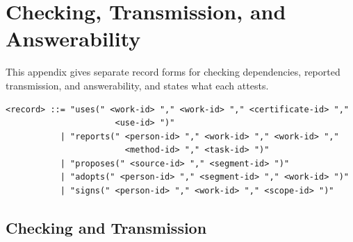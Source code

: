 \documentclass[11pt]{book}
\theoremstyle{definition}
\theoremstyle{remark}
\begin{document}
\chapter{Checking, Transmission, and Answerability}\label{app:C}

This appendix gives separate record forms for checking dependencies, reported transmission, and answerability, and states what each attests.

\begin{verbatim}
<record> ::= "uses(" <work-id> "," <work-id> "," <certificate-id> ","
                      <use-id> ")"
           | "reports(" <person-id> "," <work-id> "," <work-id> ","
                        <method-id> "," <task-id> ")"
           | "proposes(" <source-id> "," <segment-id> ")"
           | "adopts(" <person-id> "," <segment-id> "," <work-id> ")"
           | "signs(" <person-id> "," <work-id> "," <scope-id> ")"
\end{verbatim}

\section*{Checking and Transmission}
\end{document}
